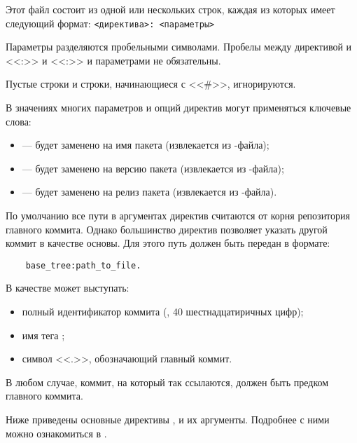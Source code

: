 Этот файл состоит из одной или нескольких строк, каждая из которых имеет следующий формат: \verb!<директива>: <параметры>!

Параметры разделяются пробельными символами. Пробелы между директивой и <<:>> и <<:>> и параметрами 
не обязательны. 

Пустые строки и строки, начинающиеся с <<\#>>, игнорируются. 

В значениях многих параметров и опций директив могут применяться ключевые слова: 
\begin{itemize}
	\item {} --- будет заменено на имя пакета (извлекается из -файла);
	\item {} --- будет заменено на версию пакета (извлекается из -файла);
	\item {} --- будет заменено на релиз пакета (извлекается из -файла).
\end{itemize}


По умолчанию все пути в аргументах директив считаются от корня репозитория главного коммита. 
Однако большинство директив позволяет указать другой коммит в качестве основы. Для этого путь 
должен быть передан в формате: 
\begin{verbatim}
	base_tree:path_to_file.
\end{verbatim}

В качестве  может выступать: 
\begin{itemize}
	\item полный идентификатор коммита (, 40 шестнадцатиричных цифр);
	\item имя тега ;
	\item символ <<.>>, обозначающий главный коммит.
\end{itemize}

В любом случае, коммит, на который так ссылаются, должен быть предком главного коммита. 


Ниже приведены основные директивы , и их аргументы. Подробнее с ними можно 
ознакомиться в .

